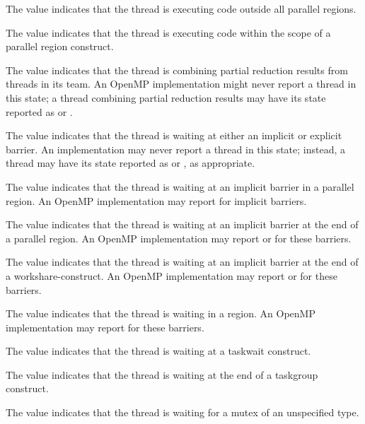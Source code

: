 The value  indicates that the thread 
is executing code outside all parallel regions.

The value  indicates that the thread 
is executing code within the scope of a parallel region construct.

The value  indicates that the thread 
is combining partial reduction results from threads in its team. An 
OpenMP implementation might never report a thread in this state; a 
thread combining partial reduction results may have its state reported 
as  or .

The value  indicates that the thread is 
waiting at either an implicit or explicit barrier. An implementation 
may never report a thread in this state; instead, a thread may have its 
state reported as   or 
, as appropriate.

The value  indicates that the 
thread is waiting at an implicit barrier in a parallel region. An 
OpenMP implementation may report  for 
implicit barriers.

The value  indicates 
that the thread is waiting at an implicit barrier at the end of a parallel 
region. An OpenMP implementation may report  
or  for these barriers.

The value   indicates 
that the thread is waiting at an implicit barrier at the end of a 
workshare-construct. An OpenMP implementation may report 
 or  
for these barriers.

The value  indicates that the 
thread is waiting in a  region. An OpenMP implementation
may report  for these barriers.

The value  indicates that the thread is 
waiting at a taskwait construct. 

The value  indicates that the thread is 
waiting at the end of a taskgroup construct. 

The value  indicates that the thread is waiting 
for a mutex of an unspecified type. 

